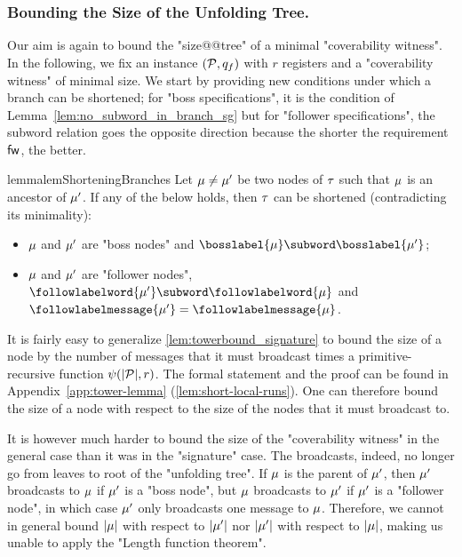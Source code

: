 \subsubsection{Bounding the Size of the Unfolding Tree.}
\label{sec:tree-bounds}

Our aim is again to bound the "size@@tree" of a minimal "coverability witness". In the following, we fix an instance $(\mathcal{P},q_f)$ with $r$ registers and a "coverability witness" of minimal size. We start by providing new conditions under which a branch can be shortened; for "boss specifications", it is the condition of Lemma~\ref{lem:no_subword_in_branch_sg} but for "follower specifications", the subword relation goes the opposite direction because the shorter the requirement $\mathsf{fw}$, the better.

\begin{restatable}{lemma}{lemShorteningBranches} 
\label{lem:shortening-branches}
	Let $\mu \ne \mu'$ be two nodes of $\tau$ such that $\mu$ is an ancestor of $\mu'$. If any of the below holds, then $\tau$ can be shortened  (contradicting its minimality):
	\begin{itemize}
	\item $\mu$ and $\mu'$ are "boss nodes" and $\bosslabel{\node} \subword \bosslabel{\node'}$; 
	\item $\mu$ and $\mu'$ are "follower nodes", $\followlabelword{\node'} \subword \followlabelword{\node}$ and $\followlabelmessage{\node'}=\followlabelmessage{\node}$.
	\end{itemize} 
\end{restatable}

It is fairly easy to generalize \cref{lem:towerbound_signature} to bound the size of a node by the number of messages that it must broadcast times a primitive-recursive function $\psi(|\mathcal{P}|,r)$. The formal statement and the proof can be found in Appendix~\ref{app:tower-lemma} (\cref{lem:short-local-runs}). 
One can therefore bound the size of a node with respect to the size of the nodes that it must broadcast to.

It is however much harder to bound the size of the "coverability witness" in the general case than it was in the "signature" case. The broadcasts, indeed, no longer go from leaves to root of the "unfolding tree". If $\mu$ is the parent of $\mu'$, then $\mu'$ broadcasts to $\mu$ if $\mu'$ is a "boss node", but $\mu$ broadcasts to $\mu'$ if $\mu'$ is a "follower node", in which case $\mu'$ only broadcasts one message to $\mu$. Therefore, we cannot in general bound $|\mu|$ with respect to $|\mu'|$ nor $|\mu'|$ with respect to $|\mu|$, making us unable to apply the "Length function theorem". 

